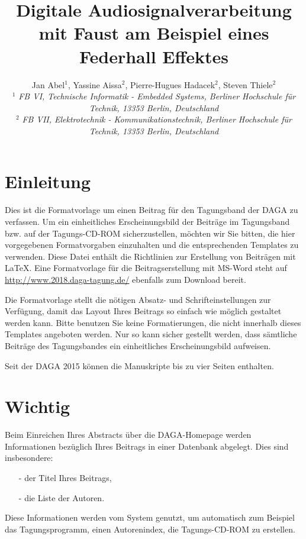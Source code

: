 \documentclass[a4paper, 10pt, twocolumn]{article}
\begin{document}
\date{}                                         %

\title{\vspace{-8mm}\textbf{\large
Digitale Audiosignalverarbeitung mit Faust am Beispiel eines Federhall Effektes}}

\author{
Jan Abel$^1$, Yassine Aissa$^2$, Pierre-Hugues Hadacek$^2$, Steven Thiele$^2$\\
$^1$ \emph{\small FB VI, Technische Informatik - Embedded Systems, Berliner
Hochschule für Technik, 13353 Berlin, Deutschland
}\\
$^2$ \emph{\small FB VII, Elektrotechnik - Kommunikationstechnik, Berliner
Hochschule für Technik, 13353 Berlin, Deutschland} } \maketitle
\thispagestyle{empty}           %
\section*{Einleitung}
\label{sec:Einleitung} Dies ist die Formatvorlage um einen Beitrag
für den Tagungsband der DAGA zu verfassen. Um ein einheitliches
Erscheinungsbild der Beiträge im Tagungsband bzw. auf der
Tagungs-CD-ROM sicherzustellen, möchten wir Sie bitten, die hier
vorgegebenen Formatvorgaben einzuhalten und die entsprechenden
Templates zu verwenden. Diese Datei enthält die Richtlinien zur
Erstellung von Beiträgen mit \LaTeX. Eine Formatvorlage für die
Beitragserstellung mit MS-Word steht auf
\url{http://www.2018.daga-tagung.de/} ebenfalls zum Download
bereit.

Die Formatvorlage stellt die nötigen Absatz- und Schrift\-einstellungen zur Verfügung, damit das Layout Ihres Beitrags so einfach wie möglich gestaltet werden kann. Bitte benutzen Sie keine Formatierungen, die nicht innerhalb dieses Templates angeboten werden. Nur so kann sicher gestellt werden, dass sämtliche Beiträge des Tagungsbandes ein einheitliches Erscheinungsbild aufweisen.

Seit der DAGA 2015 können die Manuskripte bis zu vier Seiten enthalten.


\section*{Wichtig}
\label{sec:Wichtig} Beim Einreichen Ihres Abstracts über die
DAGA-Homepage werden Informationen bezüglich Ihres Beitrags in
einer Datenbank abgelegt. Dies sind insbesondere:
\begin{itemize}
    \item[-] der Titel Ihres Beitrags,
    \item[-] die Liste der Autoren.
\end{itemize}
Diese Informationen werden vom System genutzt, um automatisch zum Beispiel das Tagungsprogramm, einen Autorenindex, die Tagungs-CD-ROM zu erstellen.
\end{document}
